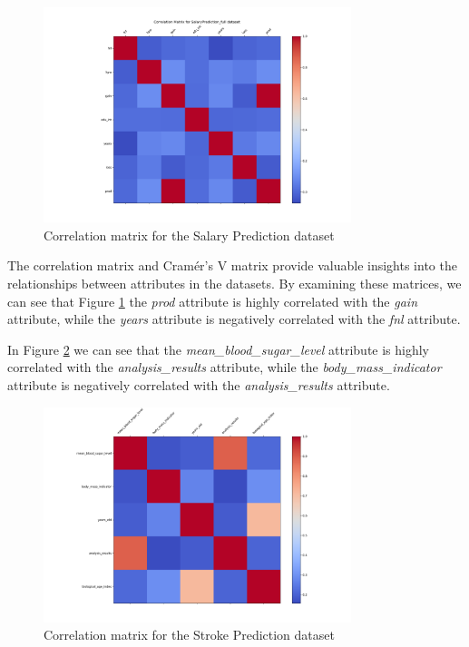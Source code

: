 \documentclass[runningheads]{paper}
\begin{document}
\begin{figure}[H]
    \centering
    \includegraphics[width=0.8\textwidth]{../plots/correlation_matrix_SalaryPrediction_full.png}
    \caption{Correlation matrix for the Salary Prediction dataset}
    \label{fig:correlation_matrix_example_salary}
\end{figure}
\pagebreak
The correlation matrix and Cramér's V matrix provide valuable insights into the
relationships between attributes in the datasets. By examining these matrices, we
can see that Figure \ref{fig:correlation_matrix_example_salary} the \textit{prod}
attribute is highly correlated with the \textit{gain} attribute, while the
\textit{years} attribute is negatively correlated with the \textit{fnl} attribute.

In Figure \ref{fig:correlation_matrix_example_stroke} we can see that the
\textit{mean\_blood\_sugar\_level} attribute is highly correlated with the
\textit{analysis\_results} attribute, while the \textit{body\_mass\_indicator} 
attribute is negatively correlated with the \textit{analysis\_results} attribute.

\begin{figure}[H]
    \centering
    \includegraphics[width=0.8\textwidth]{../plots/correlation_matrix_AVC_full.png}
    \caption{Correlation matrix for the Stroke Prediction dataset}
    \label{fig:correlation_matrix_example_stroke}
\end{figure}
\end{document}
